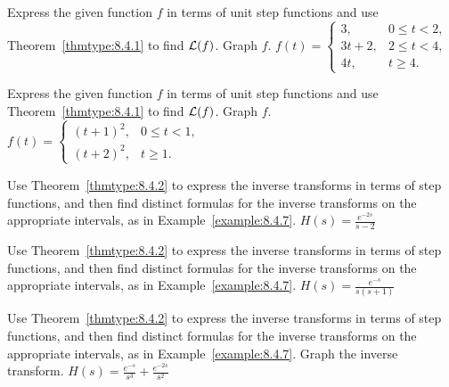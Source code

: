 \documentclass{ximera}
\begin{document}
\begin{problem}\label{exer:8.4.17}  Express the given function $f$ in terms of unit step functions and use Theorem~\ref{thmtype:8.4.1} to find ${\cal L}(f)$.  Graph $f$.
$f(t)=\left\{\begin{array}{cl}3,&0\le t<2,\\ 3t+2,&2\le
t<4,\\ 4t,&t\ge
4.\end{array}\right.$
\end{problem}

\begin{problem}\label{exer:8.4.18}  Express the given function $f$ in terms of unit step functions and use Theorem~\ref{thmtype:8.4.1} to find ${\cal L}(f)$.  Graph $f$.
$f(t)=\left\{\begin{array}{ll}(t+1)^2,&0\le t<1,
\\(t+2)^2,&t\ge1.\end{array}\right.$
\end{problem}

\begin{problem}\label{exer:8.4.19} Use Theorem~\ref{thmtype:8.4.2} to express the inverse transforms in terms of step functions, and then find distinct formulas for the inverse transforms on the appropriate intervals, as in
Example~\ref{example:8.4.7}.
$H(s)=\frac{e^{-2s}}{s-2}$
\end{problem}

\begin{problem}\label{exer:8.4.20}
Use Theorem~\ref{thmtype:8.4.2} to express the inverse transforms in terms of step functions, and then find distinct formulas for the inverse transforms on the appropriate intervals, as in
Example~\ref{example:8.4.7}.
$H(s)=\frac{e^{-s}}{s(s+1)}$


\end{problem}

\begin{problem}\label{exer:8.4.21}
Use Theorem~\ref{thmtype:8.4.2} to express the inverse transforms in terms of step functions, and then find distinct formulas for the inverse transforms on the appropriate intervals, as in
Example~\ref{example:8.4.7}.  Graph the inverse transform. 
$H(s)=\frac{e^{-s}}{s^3}+
\frac{e^{-2s}}{s^2}$
\end{problem}
\end{document}
